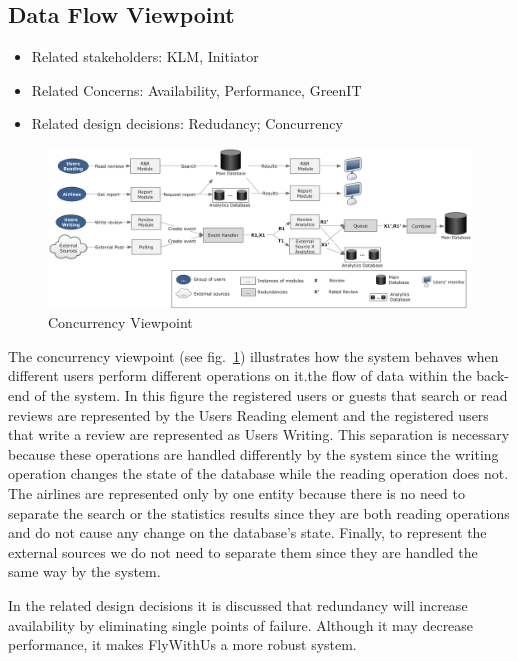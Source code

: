 % 

\subsection{Data Flow Viewpoint}

\begin{itemize}
\item Related stakeholders: KLM, Initiator
\item Related Concerns: Availability, Performance, GreenIT
\item Related design decisions: Redudancy; Concurrency
\end{itemize}

\newpage
\begin{landscape}
\begin{figure}
\includegraphics[width=600px]{ConcurrencyViewpoint.jpg}
\caption{Concurrency Viewpoint}
\label{fig:concurrency}
\end{figure}
\end{landscape}

The concurrency viewpoint (see fig.~\ref{fig:concurrency}) illustrates how the system behaves when different users perform different operations on it.the flow of data within the back-end of the system. In this figure the registered users or guests that search or read reviews are represented by the Users Reading element and the registered users that write a  review are represented as Users Writing. This separation is necessary because these operations are handled differently by the system since the writing operation changes the state of the database while the reading operation does not. The airlines are represented only by one entity because there is no need to separate the search or the statistics results since they are both reading operations and do not cause any change on the database's state. Finally, to represent the external sources we do not need to separate them since they are handled the same way by the system.

In the related design decisions it is discussed that redundancy will increase availability by eliminating single points of failure. Although it may decrease performance, it makes FlyWithUs a more robust system. 

